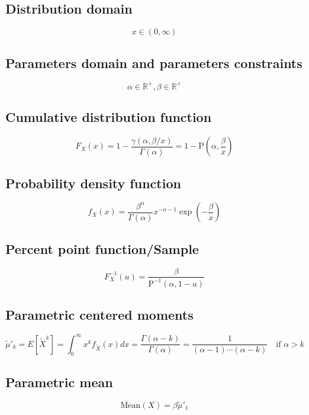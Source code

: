 \documentclass{article}
\begin{document}
\subsection{Distribution domain}
\begin{equation*} x\in\left(0,\infty\right) \end{equation*}
\subsection{Parameters domain and parameters constraints}
\begin{equation*} \alpha\in\mathbb{R}^{+}, \beta\in\mathbb{R}^{+} \end{equation*}
\subsection{Cumulative distribution function}
\begin{equation*} F_{X}\left(x\right)=1-\frac{\gamma(\alpha,\beta/x)}{\Gamma(\alpha)}=1-\text{P}\left(\alpha,\frac{\beta}{x}\right) \end{equation*}
\subsection{Probability density function}
\begin{equation*} f_{X}\left(x\right)=\frac{\beta^\alpha}{\Gamma(\alpha)} x^{-\alpha-1} \exp\left(-\frac{\beta}{x}\right) \end{equation*}
\subsection{Percent point function/Sample}
\begin{equation*} F^{-1}_{X}\left(u\right)=\frac{\beta}{\text{P}^{-1}\left(\alpha,1-u\right)} \end{equation*}
\subsection{Parametric centered moments}
\begin{equation*} \tilde{\mu}'_{k}=E[\tilde{X}^k]=\int_{0}^{\infty}x^{k}f_{\tilde{X}}\left(x\right)dx=\frac{\Gamma(\alpha-k)}{\Gamma(\alpha)}=\frac{1}{(\alpha-1) \cdots (\alpha-k)}\quad \text{if } \alpha>k \end{equation*}
\subsection{Parametric mean}
\begin{equation*} \mathrm{Mean}(X)=\beta\tilde{\mu}'_{1} \end{equation*}
\end{document}
